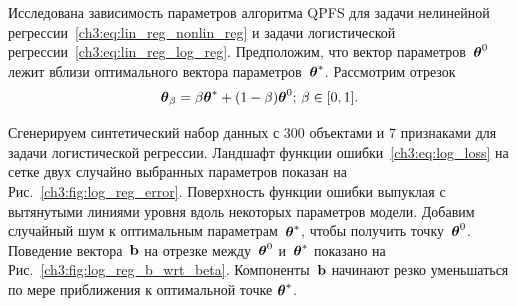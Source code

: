 Исследована зависимость параметров алгоритма QPFS для задачи нелинейной регрессии~\eqref{ch3:eq:lin_reg_nonlin_reg} и задачи логистической регрессии~\eqref{ch3:eq:lin_reg_log_reg}. 
Предположим, что вектор параметров~$\boldsymbol{\theta}^0$ лежит вблизи оптимального вектора параметров~$\boldsymbol{\theta}^*$. 
Рассмотрим отрезок
\[
\boldsymbol{\theta}_{\beta} = \beta \boldsymbol{\theta}^* + (1 - \beta) \boldsymbol{\theta}^0; \, \beta \in [0, 1] .
\]

Сгенерируем синтетический набор данных с 300 объектами и 7 признаками для задачи логистической регрессии. 
Ландшафт функции ошибки~\eqref{ch3:eq:log_loss} на сетке двух случайно выбранных параметров показан на Рис.~\ref{ch3:fig:log_reg_error}.
Поверхность функции ошибки выпуклая с вытянутыми линиями уровня вдоль некоторых параметров модели.
Добавим случайный шум к оптимальным параметрам~$\boldsymbol{\theta}^*$, чтобы получить точку~$\boldsymbol{\theta}^0$. Поведение вектора~$\mathbf{b}$ на отрезке между~$\boldsymbol{\theta}^0$ и~$\boldsymbol{\theta}^*$ показано на Рис.~\ref{ch3:fig:log_reg_b_wrt_beta}.
Компоненты~$\mathbf{b}$ начинают резко уменьшаться по мере приближения к оптимальной точке $\boldsymbol{\theta}^*$.
